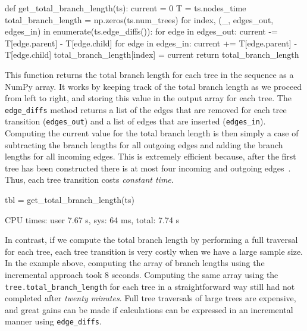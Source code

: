 \documentclass[graybox]{svmult}
\begin{document}
\begin{pythoncode}
def get_total_branch_length(ts):
    current = 0
    T = ts.nodes_time
    total_branch_length = np.zeros(ts.num_trees)
    for index, (_, edges_out, edges_in) in enumerate(ts.edge_diffs()):
        for edge in edges_out:
            current -= T[edge.parent] - T[edge.child]
        for edge in edges_in:
            current += T[edge.parent] - T[edge.child]
        total_branch_length[index] = current
    return total_branch_length
\end{pythoncode}

    This function returns the total branch length for each tree in the
sequence as a NumPy array. It works by keeping track of the total branch
length as we proceed from left to right, and storing this value in the
output array for each tree. The \texttt{edge\_diffs} method returns a
list of the edges that are removed for each tree transition
(\texttt{edges\_out}) and a list of edges that are inserted
(\texttt{edges\_in}). Computing the current value for the total branch
length is then simply a case of subtracting the branch lengths for all
outgoing edges and adding the branch lengths for all incoming edges.
This is extremely efficient because, after the first tree has been
constructed there is at most four incoming and outgoing
edges~\citep{kelleher2016efficient}. Thus,
each tree transition costs \emph{constant time}.

\begin{pythoncode}
tbl = get_total_branch_length(ts)

CPU times: user 7.67 s, sys: 64 ms, total: 7.74 s
\end{pythoncode}

In contrast, if we compute the total branch length by performing a
full traversal for each tree, each tree transition is very costly
when we have a large sample size. In the example above, computing the array of branch lengths
using the incremental approach took 8 seconds. Computing the
same array using the \texttt{tree.total\_branch\_length} for each tree
in a straightforward way still had not completed after \emph{twenty
minutes}. Full tree traversals of large trees are
expensive, and great gains can be made if calculations can be expressed
in an incremental manner using \texttt{edge\_diffs}.


\end{document}
